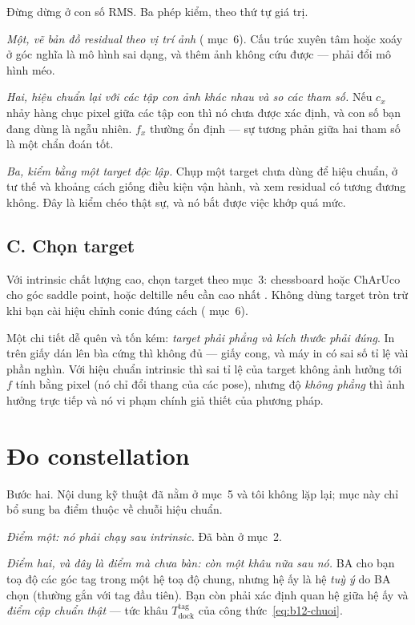 \documentclass[../../marker.tex]{subfiles}
\begin{document}
Đừng dừng ở con số RMS. Ba phép kiểm, theo thứ tự giá trị.

\emph{Một, vẽ bản đồ residual theo vị trí ảnh} ( mục~6). Cấu trúc xuyên tâm hoặc xoáy ở góc nghĩa là mô hình sai dạng, và thêm ảnh không cứu được --- phải đổi mô hình méo.

\emph{Hai, hiệu chuẩn lại với các tập con ảnh khác nhau và so các tham số.} Nếu \(c_x\) nhảy hàng chục pixel giữa các tập con thì nó chưa được xác định, và con số bạn đang dùng là ngẫu nhiên. \(f_x\) thường ổn định --- sự tương phản giữa hai tham số là một chẩn đoán tốt.

\emph{Ba, kiểm bằng một target độc lập.} Chụp một target chưa dùng để hiệu chuẩn, ở tư thế và khoảng cách giống điều kiện vận hành, và xem residual có tương đương không. Đây là kiểm chéo thật sự, và nó bắt được việc khớp quá mức.

\subsection{C. Chọn target}

Với intrinsic chất lượng cao, chọn target theo  mục~3: chessboard hoặc ChArUco cho góc saddle point, hoặc deltille nếu cần cao nhất \cite{chen2018deltille}. Không dùng target tròn trừ khi bạn cài hiệu chỉnh conic đúng cách ( mục~6).

Một chi tiết dễ quên và tốn kém: \emph{target phải phẳng và kích thước phải đúng}. In trên giấy dán lên bìa cứng thì không đủ --- giấy cong, và máy in có sai số tỉ lệ vài phần nghìn. Với hiệu chuẩn intrinsic thì sai tỉ lệ của target không ảnh hưởng tới \(f\) tính bằng pixel (nó chỉ đổi thang của các pose), nhưng độ \emph{không phẳng} thì ảnh hưởng trực tiếp và nó vi phạm chính giả thiết của phương pháp.

\section{Đo constellation}

Bước hai. Nội dung kỹ thuật đã nằm ở  mục~5 và tôi không lặp lại; mục này chỉ bổ sung ba điểm thuộc về chuỗi hiệu chuẩn.

\emph{Điểm một: nó phải chạy sau intrinsic.} Đã bàn ở mục~2.

\emph{Điểm hai, và đây là điểm mà  chưa bàn: còn một khâu nữa sau nó.} BA cho bạn toạ độ các góc tag trong một hệ toạ độ chung, nhưng hệ ấy là hệ \emph{tuỳ ý} do BA chọn (thường gắn với tag đầu tiên). Bạn còn phải xác định quan hệ giữa hệ ấy và \emph{điểm cập chuẩn thật} --- tức khâu \(T^{\text{tag}}_{\text{dock}}\) của công thức~\eqref{eq:b12-chuoi}.
\end{document}
